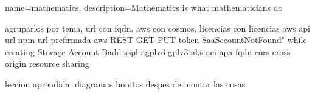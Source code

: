 \usepackage{glossaries}

\makeglossaries


{
    name=mathematics,
    description={Mathematics is what mathematicians do}
}

agruparlos por tema, url con fqdn, aws con cosmos, licencias con licencias
aws
api
url
npm
url prefirmada
aws
REST
GET
PUT
token
SaaSccountNotFound" while creating Storage Account
Badd
sspl
agplv3
gplv3
aks
aci
apa
fqdn
cors cross origin resource sharing


leccion aprendida: diagramas bonitos despes de montar las cosas
